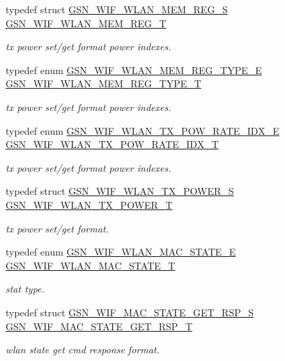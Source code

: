 \begin{DoxyCompactItemize}
typedef struct \hyperlink{a00390}{GSN\_\-WIF\_\-WLAN\_\-MEM\_\-REG\_\-S} \hyperlink{a00677_ga9d8aade166418018f4e609e679f7c603}{GSN\_\-WIF\_\-WLAN\_\-MEM\_\-REG\_\-T}
\begin{DoxyCompactList}\small\item\em tx power set/get format power indexes. \end{DoxyCompactList}\item 
typedef enum \hyperlink{a00677_ga7f657dfcb65c6810c23ae68bbca0b101}{GSN\_\-WIF\_\-WLAN\_\-MEM\_\-REG\_\-TYPE\_\-E} \hyperlink{a00677_gad221ad803b8f2c5c4e24ef1f0c0aa83c}{GSN\_\-WIF\_\-WLAN\_\-MEM\_\-REG\_\-TYPE\_\-T}
\begin{DoxyCompactList}\small\item\em tx power set/get format power indexes. \end{DoxyCompactList}\item 
typedef enum \hyperlink{a00677_ga75fc31972dc5127c4ee4b3e585ab0206}{GSN\_\-WIF\_\-WLAN\_\-TX\_\-POW\_\-RATE\_\-IDX\_\-E} \hyperlink{a00677_gaa864eedc8e384ed0ea49b62f267aff72}{GSN\_\-WIF\_\-WLAN\_\-TX\_\-POW\_\-RATE\_\-IDX\_\-T}
\begin{DoxyCompactList}\small\item\em tx power set/get format power indexes. \end{DoxyCompactList}\item 
typedef struct \hyperlink{a00408}{GSN\_\-WIF\_\-WLAN\_\-TX\_\-POWER\_\-S} \hyperlink{a00677_ga04f719a66b056bce000089417b9775bf}{GSN\_\-WIF\_\-WLAN\_\-TX\_\-POWER\_\-T}
\begin{DoxyCompactList}\small\item\em tx power set/get format. \end{DoxyCompactList}\item 
typedef enum \hyperlink{a00677_gaf26e714e09b57b3b2a5f21341613761d}{GSN\_\-WIF\_\-WLAN\_\-MAC\_\-STATE\_\-E} \hyperlink{a00677_gabb160daeefaad3c313cfd17480013311}{GSN\_\-WIF\_\-WLAN\_\-MAC\_\-STATE\_\-T}
\begin{DoxyCompactList}\small\item\em stat type. \end{DoxyCompactList}\item 
typedef struct \hyperlink{a00341}{GSN\_\-WIF\_\-MAC\_\-STATE\_\-GET\_\-RSP\_\-S} \hyperlink{a00677_ga6dbab71e19ca02665a3be40e8850b059}{GSN\_\-WIF\_\-MAC\_\-STATE\_\-GET\_\-RSP\_\-T}
\begin{DoxyCompactList}\small\item\em wlan state get cmd response format. \end{DoxyCompactList}\item 

\end{DoxyCompactItemize}
